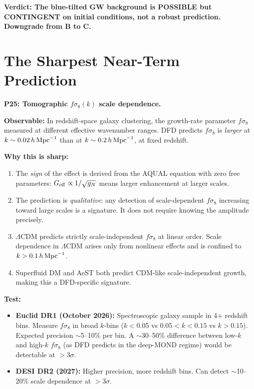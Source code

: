 \documentclass[11pt]{article}
\newcommand{\LCDM}{$\Lambda$CDM}
\newcommand{\Geff}{G_{\rm eff}}
\begin{document}
\textbf{Verdict: The blue-tilted GW background is POSSIBLE but
CONTINGENT on initial conditions, not a robust prediction.
Downgrade from B to C.}


\section{The Sharpest Near-Term Prediction}
\label{sec:sharpest}

\begin{tcolorbox}[colback=green!5!white, colframe=green!60!black,
  title=\textbf{SHARPEST NEAR-TERM DFD PREDICTION (2026--2027)}]

\textbf{P25: Tomographic $f\sigma_8(k)$ scale dependence.}

\textbf{Observable:} In redshift-space galaxy clustering, the
growth-rate parameter $f\sigma_8$ measured at different effective
wavenumber ranges.  DFD predicts $f\sigma_8$ is \emph{larger} at
$k \sim 0.02\,h\,{\rm Mpc}^{-1}$ than at $k \sim 0.2\,h\,{\rm Mpc}^{-1}$,
at fixed redshift.

\textbf{Why this is sharp:}
\begin{enumerate}
\item The \emph{sign} of the effect is derived from the AQUAL equation
  with zero free parameters: $\Geff \propto 1/\sqrt{g_N}$ means larger
  enhancement at larger scales.
\item The prediction is \emph{qualitative}: any detection of scale-dependent
  $f\sigma_8$ increasing toward large scales is a signature.  It does not
  require knowing the amplitude precisely.
\item \LCDM{} predicts strictly scale-independent $f\sigma_8$ at linear
  order.  Scale dependence in \LCDM{} arises only from nonlinear effects
  and is confined to $k > 0.1\,h\,{\rm Mpc}^{-1}$.
\item Superfluid DM and AeST both predict CDM-like scale-independent
  growth, making this a DFD-specific signature.
\end{enumerate}

\textbf{Test:}
\begin{itemize}
\item \textbf{Euclid DR1 (October 2026):} Spectroscopic galaxy sample
  in 4+ redshift bins.  Measure $f\sigma_8$ in broad $k$-bins
  ($k < 0.05$ vs $0.05 < k < 0.15$ vs $k > 0.15$).  Expected precision
  $\sim$5--10\% per bin.  A $\sim$30--50\% difference between low-$k$
  and high-$k$ $f\sigma_8$ (as DFD predicts in the deep-MOND regime)
  would be detectable at $>3\sigma$.
\item \textbf{DESI DR2 (2027):} Higher precision, more redshift bins.
  Can detect $\sim$10--20\% scale dependence at $>3\sigma$.
\end{itemize}


\end{tcolorbox}
\end{document}

